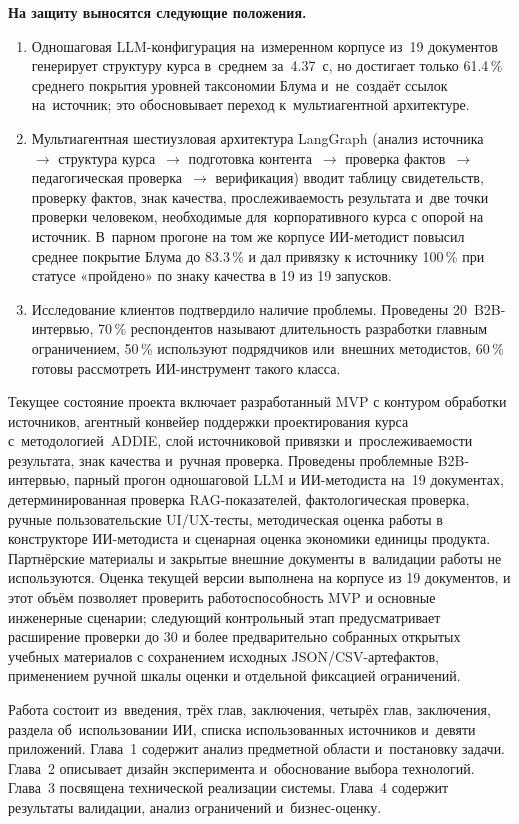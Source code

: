 \textbf{На защиту выносятся следующие положения.}
\begin{enumerate}
  \item Одношаговая LLM-конфигурация на~измеренном корпусе
    из~19 документов генерирует структуру курса в~среднем за~4.37~с,
    но достигает только 61.4\,\% среднего покрытия уровней таксономии
    Блума и~не~создаёт ссылок на~источник; это обосновывает переход
    к~мультиагентной архитектуре.
  \item Мультиагентная шестиузловая архитектура LangGraph
    (анализ источника~$\rightarrow$ структура курса~$\rightarrow$
    подготовка контента~$\rightarrow$ проверка фактов~$\rightarrow$
    педагогическая проверка~$\rightarrow$ верификация)
    вводит таблицу свидетельств, проверку фактов, знак качества,
    прослеживаемость результата и~две точки проверки человеком,
    необходимые для~корпоративного курса с опорой на источник.
    В~парном прогоне на том же корпусе
    ИИ-методист
    повысил среднее покрытие Блума до 83.3\,\% и дал привязку
    к источнику 100\,\% при статусе «пройдено» по знаку качества в 19 из 19 запусков.
  \item Исследование клиентов подтвердило наличие проблемы. Проведены
    20~B2B-интервью, 70\,\% респондентов называют
    длительность разработки главным ограничением, 50\,\% используют
    подрядчиков или~внешних методистов, 60\,\% готовы рассмотреть
    ИИ-инструмент такого класса.
\end{enumerate}

Текущее состояние проекта включает разработанный MVP с контуром
обработки источников, агентный конвейер поддержки проектирования
курса с~методологией~ADDIE, слой источниковой привязки
и~прослеживаемости результата, знак качества и~ручная проверка.
Проведены проблемные B2B-интервью, парный прогон одношаговой LLM
и ИИ-методиста на~19 документах, детерминированная проверка
RAG-показателей, фактологическая проверка, ручные пользовательские
UI/UX-тесты, методическая оценка работы в конструкторе ИИ-методиста
и сценарная оценка экономики единицы продукта.
Партнёрские материалы и закрытые внешние документы в~валидации
работы не используются.
Оценка текущей версии выполнена на корпусе из 19 документов, и этот
объём позволяет проверить работоспособность MVP и основные инженерные
сценарии; следующий контрольный этап предусматривает расширение
проверки до 30 и более предварительно собранных открытых учебных
материалов с сохранением исходных JSON/CSV-артефактов, применением
ручной шкалы оценки и отдельной фиксацией ограничений.

Работа состоит из~введения,
\ifomitvalidationchapter
трёх глав, заключения,
\else
четырёх глав, заключения,
\fi
раздела об~использовании ИИ, списка использованных источников
и~девяти приложений.
Глава~1 содержит анализ предметной области и~постановку задачи.
Глава~2 описывает дизайн эксперимента и~обоснование выбора технологий.
Глава~3 посвящена технической реализации системы.
\ifomitvalidationchapter
\else
Глава~4 содержит результаты валидации, анализ ограничений
и~бизнес-оценку.
\fi
